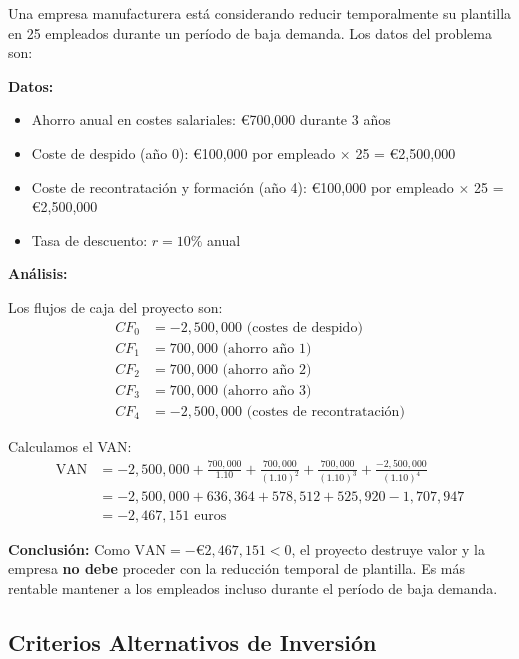 \begin{ejemplo}
Una empresa manufacturera está considerando reducir temporalmente su plantilla en 25 empleados durante un período de baja demanda. Los datos del problema son:

\textbf{Datos:}
\begin{itemize}
\item Ahorro anual en costes salariales: €700,000 durante 3 años
\item Coste de despido (año 0): €100,000 por empleado $\times$ 25 = €2,500,000
\item Coste de recontratación y formación (año 4): €100,000 por empleado $\times$ 25 = €2,500,000
\item Tasa de descuento: $r = 10\%$ anual
\end{itemize}

\textbf{Análisis:}

Los flujos de caja del proyecto son:
\begin{align*}
CF_0 &= -2{,}500{,}000 \text{ (costes de despido)} \\
CF_1 &= 700{,}000 \text{ (ahorro año 1)} \\
CF_2 &= 700{,}000 \text{ (ahorro año 2)} \\
CF_3 &= 700{,}000 \text{ (ahorro año 3)} \\
CF_4 &= -2{,}500{,}000 \text{ (costes de recontratación)}
\end{align*}

Calculamos el VAN:
\begin{align*}
\text{VAN} &= -2{,}500{,}000 + \frac{700{,}000}{1.10} + \frac{700{,}000}{(1.10)^2} + \frac{700{,}000}{(1.10)^3} + \frac{-2{,}500{,}000}{(1.10)^4} \\
&= -2{,}500{,}000 + 636{,}364 + 578{,}512 + 525{,}920 - 1{,}707{,}947 \\
&= -2{,}467{,}151 \text{ euros}
\end{align*}

\textbf{Conclusión:} Como $\text{VAN} = -\text{€}2{,}467{,}151 < 0$, el proyecto destruye valor y la empresa \textbf{no debe} proceder con la reducción temporal de plantilla. Es más rentable mantener a los empleados incluso durante el período de baja demanda.
\end{ejemplo}

\subsection{Criterios Alternativos de Inversión}

